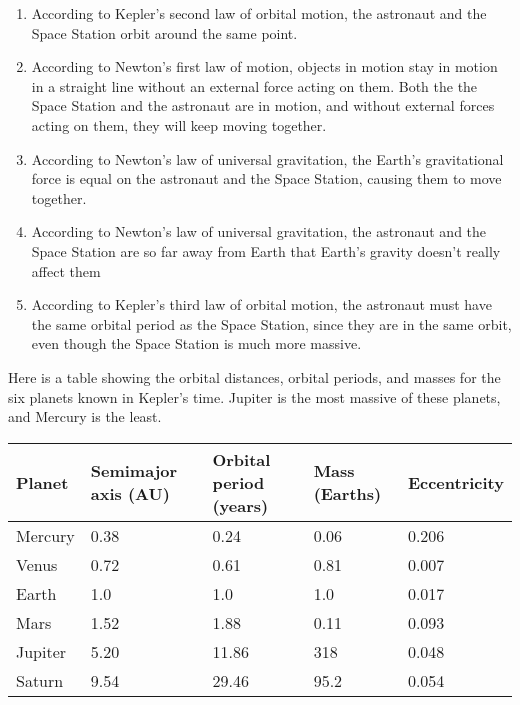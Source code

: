 \documentclass[12pt]{article}
\begin{document}
\begin{enumerate}
\begin{minipage}{\textwidth}
{\begin{enumerate}[label=(\Alph*)]
\setlength\itemsep{0.0em}
\item{ According to Kepler's second law of orbital motion, the astronaut and the Space Station orbit around the same point. }
\item{ According to Newton's first law of motion, objects in motion stay in motion in a straight line without an external force acting on them. Both the the Space Station and the astronaut are in motion, and without external forces acting on them, they will keep moving together. }
\item{ According to Newton's law of universal gravitation, the Earth's gravitational force is equal on the astronaut and the Space  Station, causing them to move together. }
\item{ According to Newton's law of universal gravitation, the astronaut and the Space Station are so far away from Earth that Earth's  gravity doesn't really affect them }
\item{ According to Kepler's third law of orbital motion, the astronaut must have the same orbital period as the Space Station, since they are in the same orbit, even though the Space Station is much more massive. }
\end{enumerate}
} %
\end{minipage}


\vspace{0.5in}

\begin{minipage}{\textwidth}
\item{Here is a table showing the orbital distances, orbital periods, and masses for the six planets known in Kepler's time. Jupiter is the most massive of these planets, and Mercury is the least.

\bigskip

\begin{center}
\begin{tabular}{|l|l|l|l|l|}
\hline
Planet  & Semimajor axis (AU) & Orbital period (years) & Mass (Earths) & Eccentricity \\ \hline
Mercury & 0.38                & 0.24                   & 0.06                          & 0.206  \\ \hline
Venus   & 0.72                & 0.61                   & 0.81                          & 0.007  \\ \hline
Earth   & 1.0                 & 1.0                    & 1.0                           & 0.017  \\ \hline
Mars    & 1.52                & 1.88                   & 0.11                          & 0.093  \\ \hline
Jupiter & 5.20                & 11.86                  & 318                           & 0.048  \\ \hline
Saturn  & 9.54                & 29.46                  & 95.2                          & 0.054  \\ \hline
\end{tabular}
\end{center}

}
\end{minipage}
\end{enumerate}
\end{document}
